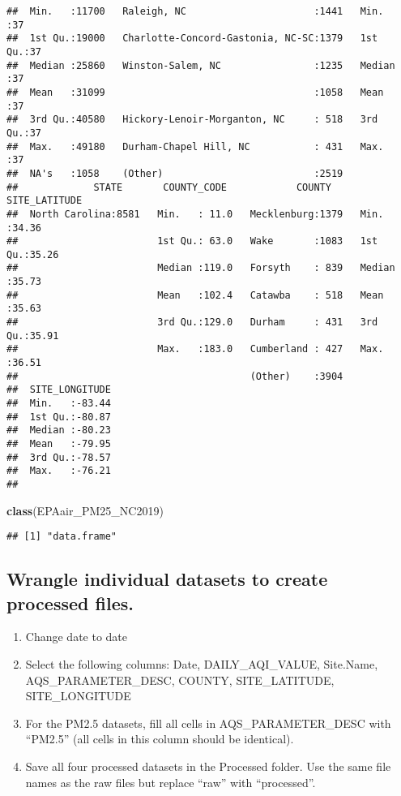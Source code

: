 \documentclass[]{article}
\newenvironment{Shaded}{\begin{snugshade}}{\end{snugshade}}
\newcommand{\KeywordTok}[1]{\textcolor[rgb]{0.13,0.29,0.53}{\textbf{#1}}}
\newcommand{\NormalTok}[1]{#1}
\providecommand{\tightlist}{%
  \setlength{\itemsep}{0pt}\setlength{\parskip}{0pt}}
\begin{document}
\begin{verbatim}
##  Min.   :11700   Raleigh, NC                      :1441   Min.   :37  
##  1st Qu.:19000   Charlotte-Concord-Gastonia, NC-SC:1379   1st Qu.:37  
##  Median :25860   Winston-Salem, NC                :1235   Median :37  
##  Mean   :31099                                    :1058   Mean   :37  
##  3rd Qu.:40580   Hickory-Lenoir-Morganton, NC     : 518   3rd Qu.:37  
##  Max.   :49180   Durham-Chapel Hill, NC           : 431   Max.   :37  
##  NA's   :1058    (Other)                          :2519               
##             STATE       COUNTY_CODE            COUNTY     SITE_LATITUDE  
##  North Carolina:8581   Min.   : 11.0   Mecklenburg:1379   Min.   :34.36  
##                        1st Qu.: 63.0   Wake       :1083   1st Qu.:35.26  
##                        Median :119.0   Forsyth    : 839   Median :35.73  
##                        Mean   :102.4   Catawba    : 518   Mean   :35.63  
##                        3rd Qu.:129.0   Durham     : 431   3rd Qu.:35.91  
##                        Max.   :183.0   Cumberland : 427   Max.   :36.51  
##                                        (Other)    :3904                  
##  SITE_LONGITUDE  
##  Min.   :-83.44  
##  1st Qu.:-80.87  
##  Median :-80.23  
##  Mean   :-79.95  
##  3rd Qu.:-78.57  
##  Max.   :-76.21  
## 
\end{verbatim}

\begin{Shaded}
\begin{Highlighting}[]
\KeywordTok{class}\NormalTok{(EPAair_PM25_NC2019)}
\end{Highlighting}
\end{Shaded}

\begin{verbatim}
## [1] "data.frame"
\end{verbatim}

\hypertarget{wrangle-individual-datasets-to-create-processed-files.}{%
\subsection{Wrangle individual datasets to create processed
files.}\label{wrangle-individual-datasets-to-create-processed-files.}}

\begin{enumerate}
\def\labelenumi{\arabic{enumi}.}
\setcounter{enumi}{2}
\tightlist
\item
  Change date to date
\item
  Select the following columns: Date, DAILY\_AQI\_VALUE, Site.Name,
  AQS\_PARAMETER\_DESC, COUNTY, SITE\_LATITUDE, SITE\_LONGITUDE
\item
  For the PM2.5 datasets, fill all cells in AQS\_PARAMETER\_DESC with
  ``PM2.5'' (all cells in this column should be identical).
\item
  Save all four processed datasets in the Processed folder. Use the same
  file names as the raw files but replace ``raw'' with ``processed''.
\end{enumerate}
\end{document}
